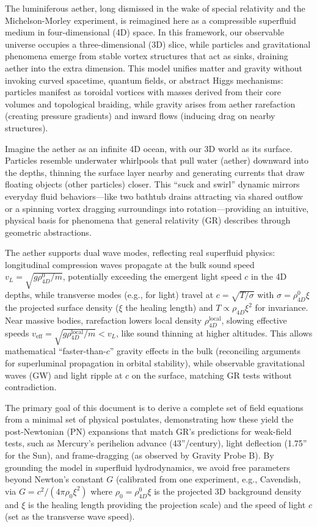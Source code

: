 \documentclass{article}
\begin{document}
The luminiferous aether, long dismissed in the wake of special relativity and the Michelson-Morley experiment, is reimagined here as a compressible superfluid medium in four-dimensional (4D) space. In this framework, our observable universe occupies a three-dimensional (3D) slice, while particles and gravitational phenomena emerge from stable vortex structures that act as sinks, draining aether into the extra dimension. This model unifies matter and gravity without invoking curved spacetime, quantum fields, or abstract Higgs mechanisms: particles manifest as toroidal vortices with masses derived from their core volumes and topological braiding, while gravity arises from aether rarefaction (creating pressure gradients) and inward flows (inducing drag on nearby structures).

Imagine the aether as an infinite 4D ocean, with our 3D world as its surface. Particles resemble underwater whirlpools that pull water (aether) downward into the depths, thinning the surface layer nearby and generating currents that draw floating objects (other particles) closer. This ``suck and swirl'' dynamic mirrors everyday fluid behaviors---like two bathtub drains attracting via shared outflow or a spinning vortex dragging surroundings into rotation---providing an intuitive, physical basis for phenomena that general relativity (GR) describes through geometric abstractions.

The aether supports dual wave modes, reflecting real superfluid physics: longitudinal compression waves propagate at the bulk sound speed $v_L = \sqrt{g \rho_{4D}^0 / m}$, potentially exceeding the emergent light speed $c$ in the 4D depths, while transverse modes (e.g., for light) travel at $c = \sqrt{T / \sigma}$ with $\sigma = \rho_{4D}^0 \xi$ the projected surface density ($\xi$ the healing length) and $T \propto \rho_{4D} \xi^2$ for invariance. Near massive bodies, rarefaction lowers local density $\rho_{4D}^{\text{local}}$, slowing effective speeds $v_{\text{eff}} = \sqrt{g \rho_{4D}^{\text{local}} / m} < v_L$, like sound thinning at higher altitudes. This allows mathematical ``faster-than-$c$'' gravity effects in the bulk (reconciling arguments for superluminal propagation in orbital stability), while observable gravitational waves (GW) and light ripple at $c$ on the surface, matching GR tests without contradiction.

The primary goal of this document is to derive a complete set of field equations from a minimal set of physical postulates, demonstrating how these yield the post-Newtonian (PN) expansions that match GR's predictions for weak-field tests, such as Mercury's perihelion advance (43''/century), light deflection (1.75'' for the Sun), and frame-dragging (as observed by Gravity Probe B). By grounding the model in superfluid hydrodynamics, we avoid free parameters beyond Newton's constant $G$ (calibrated from one experiment, e.g., Cavendish, via $G = c^2 / (4\pi \rho_0 \xi^2)$ where $\rho_0 = \rho_{4D}^0 \xi$ is the projected 3D background density and $\xi$ is the healing length providing the projection scale) and the speed of light $c$ (set as the transverse wave speed).
\end{document}
